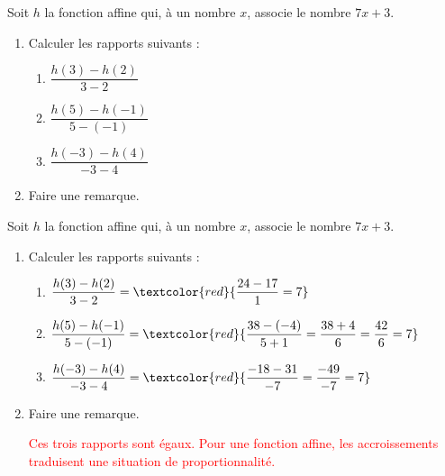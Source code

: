 \begin{exercice*}
    Soit $h$ la fonction affine qui, à un nombre $x$, associe le nombre $7x+3$.
    \begin{enumerate}
        \item Calculer les rapports suivants :
        \begin{enumerate}
            \item $\dfrac{h(3)-h(2)}{3-2}$ \smallskip
            \item $\dfrac{h(5)-h(-1)}{5-(-1)}$ \smallskip
            \item $\dfrac{h(-3)-h(4)}{-3-4}$
        \end{enumerate}
        \item Faire une remarque.
    \end{enumerate}
\end{exercice*}
\begin{corrige}
    Soit $h$ la fonction affine qui, à un nombre $x$, associe le nombre $7x+3$.

    \begin{enumerate}
        \item Calculer les rapports suivants :
        
        \begin{enumerate}
            \item $\dfrac{h(3)-h(2)}{3-2} = \textcolor{red}{\dfrac{24-17}{1}=7}$ \smallskip
            \item $\dfrac{h(5)-h(-1)}{5-(-1)} = \textcolor{red}{\dfrac{38-(-4)}{5+1}=\dfrac{38+4}{6}=\dfrac{42}{6}=7}$ \smallskip
            \item $\dfrac{h(-3)-h(4)}{-3-4} = \textcolor{red}{\dfrac{-18-31}{-7}=\dfrac{-49}{-7}=7}$
        \end{enumerate}
        \item Faire une remarque.
        
        \textcolor{red}{Ces trois rapports sont égaux. Pour une fonction affine, les accroissements traduisent une situation de proportionnalité.}
    \end{enumerate}
\end{corrige}
